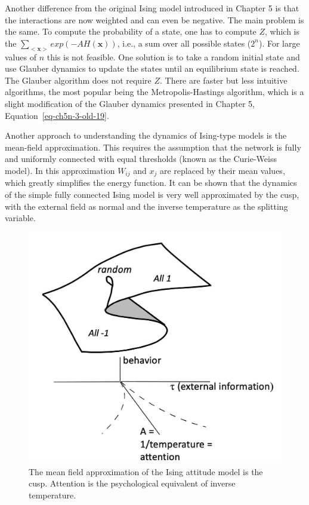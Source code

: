 \documentclass[
  a4paper,
  DIV=11,
  numbers=noendperiod]{scrreprt}
\begin{document}
Another difference from the original Ising model introduced in Chapter 5
is that the interactions are now weighted and can even be negative. The
main problem is the same. To compute the probability of a state, one has
to compute \(Z\), which is the
\(\sum_{< \mathbf{x} >}^{}{exp( - AH\left( \mathbf{x} \right))}\), i.e.,
a sum over all possible states (\(2^{n}\)). For large values of \(n\)
this is not feasible. One solution is to take a random initial state and
use Glauber dynamics to update the states until an equilibrium state is
reached. The Glauber algorithm does not require \(Z\). There are faster
but less intuitive algorithms, the most popular being the
Metropolis-Hastings algorithm, which is a slight modification of the
Glauber dynamics presented in Chapter 5,
Equation~\ref{eq-ch5n-3-old-19}.

Another approach to understanding the dynamics of Ising-type models is
the mean-field approximation. This requires the assumption that the
network is fully and uniformly connected with equal thresholds (known as
the Curie-Weiss model). In this approximation \(W_{ij}\) and \(x_{j}\)
are replaced by their mean values, which greatly simplifies the energy
function. It can be shown that the dynamics of the simple fully
connected Ising model is very well approximated by the cusp, with the
external field as normal and the inverse temperature as the splitting
variable.

\begin{figure}

{\centering \includegraphics{media/ch6/image11.jpg}

}

\caption{\label{fig-ch6-img11-old-80}The mean field approximation of the
Ising attitude model is the cusp. Attention is the psychological
equivalent of inverse temperature.}

\end{figure}
\end{document}
